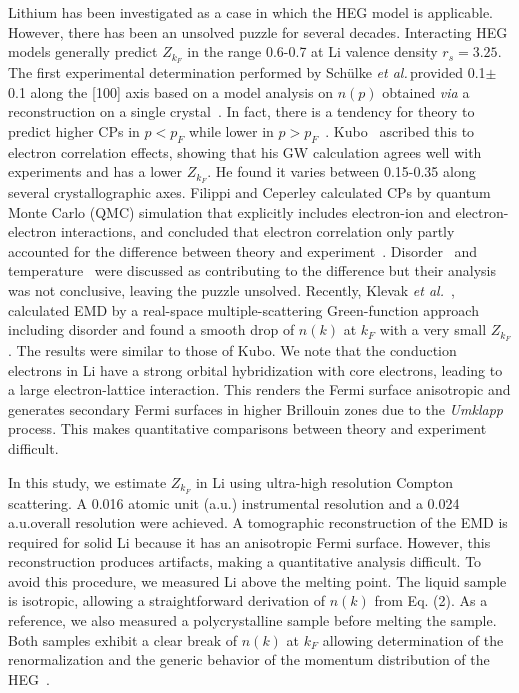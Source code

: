 \documentclass[twocolumn,showpacs,showkeys,fleqn,prl,superscriptaddress]{revtex4}%
\newcommand{\ii}[1]{\textit{#1}}
\begin{document}
Lithium has been investigated as a case in which the HEG model is applicable.
However, there has been an unsolved puzzle for several decades.
Interacting HEG models generally predict $Z_{k_F}$ in the range 0.6-0.7 at Li valence density $r_s=3.25$.
The first experimental determination performed by Sch{\"u}lke \ii{et al.}\,provided 0.1$\pm$0.1 along the [100] axis based on a model analysis on $n(p)$ obtained \ii{via} a reconstruction on a single crystal~\cite{schulke96}.
In fact, there is a tendency %
for theory to predict higher CPs in $p<p_F$ while lower in $p>p_F$~\cite{saku95}.
Kubo~\cite{kubo95,kubo97} ascribed this to electron correlation effects, showing that his GW calculation agrees well with experiments and has a lower $Z_{k_F}$. He found it varies between 0.15-0.35 along several crystallographic axes.
Filippi and Ceperley calculated CPs by quantum Monte Carlo (QMC) simulation that explicitly includes electron-ion and electron-electron interactions, and concluded that electron correlation only partly accounted for the difference between theory and experiment~\cite{filippi99}.
Disorder~\cite{dugdale98} and temperature~\cite{stern01} were discussed as contributing to the difference but their analysis was not conclusive, leaving the puzzle unsolved.
Recently, Klevak \ii{et al.}~\cite{klevak16}, calculated EMD by a real-space multiple-scattering Green-function approach including disorder and found a smooth drop of $n(k)$ at $k_F$ with a very small $Z_{k_F}$. The results were similar to those of Kubo.
We note that the conduction electrons in Li have a strong orbital hybridization with core electrons, leading to a large electron-lattice interaction.
This renders the Fermi surface anisotropic and generates secondary Fermi surfaces in higher Brillouin zones due to the {\it{Umklapp}} process.
This makes quantitative comparisons between theory and experiment difficult. 

In this study, we estimate $Z_{k_F}$ in Li using ultra-high resolution Compton scattering. A 0.016 atomic unit (a.u.) instrumental resolution and a 0.024 a.u.\;overall resolution were achieved.
A tomographic reconstruction of the EMD is required for solid Li because it has an anisotropic Fermi surface. However, this reconstruction produces artifacts, making a quantitative analysis difficult.
To avoid this procedure, we measured Li above the melting point.
The liquid sample is isotropic, allowing a straightforward derivation of $n(k)$ from Eq. (2).
As a reference, we also measured a polycrystalline sample before melting the sample.
Both samples exhibit a clear break of $n(k)$ at $k_F$ allowing determination of the renormalization and the generic behavior of the momentum distribution of the HEG~\cite{holz11}.
\end{document}
